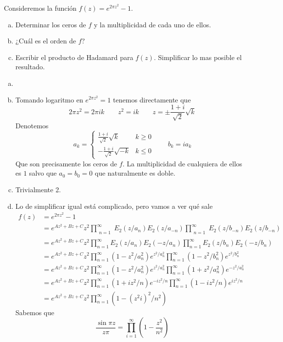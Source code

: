 \documentclass[twoside]{article}
\begin{document}
\newpage
\begin{ejercicio}{4}
Consideremos la función $f(z)=e^{2\pi z^2}-1$.
\begin{enumerate}[a)]
\item Determinar los ceros de $f$ y la multiplicidad de cada uno de ellos. 
\item ¿Cuál es el orden de $f$?
\item Escribir el producto de Hadamard para $f(z)$.  Simplificar lo mas posible el resultado. 
\end{enumerate}
\end{ejercicio}
\begin{solucion}
\begin{enumerate}[a)]
\item[]
\item Tomando logaritmo en $e^{2\pi z^2} = 1$ tenemos directamente que
$$
2\pi z^2 = 2\pi i k \qquad z^2 = ik \qquad z = \pm \frac{1+i}{\sqrt{2}}\sqrt{k} 
$$
Denotemos
$$
a_k = \begin{cases}
\frac{1+i}{\sqrt{2}}\sqrt{k} & k\geq 0\\
-\frac{1+i}{\sqrt{2}}\sqrt{-k} & k\leq 0
\end{cases}
\qquad
b_k = ia_k
$$
Que son precisamente los ceros de $f$. La multiplicidad de cualquiera de ellos es $1$ salvo que $a_0=b_0=0$ que naturalmente es doble. 
\item Trivialmente 2.
\item Lo de simplificar igual está complicado, pero vamos a ver qué sale
\begin{align*}
f(z) & = e^{2\pi z^2}-1\\
&= e^{Az^2+Bz+C}z^2\prod_{\substack{n=1}}^\infty E_2(z/a_{n})E_2(z/a_{-n})\prod_{\substack{n=1}}^\infty E_2(z/b_{-n})E_2(z/b_{-n})\\
&= e^{Az^2+Bz+C}z^2\prod_{n=1}^\infty E_2(z/a_n)E_2(-z/a_{n})\prod_{n=1}^\infty E_2(z/b_n)E_2(-z/b_n)\\
&= e^{Az^2+Bz+C}z^2\prod_{n=1}^\infty (1-z^2/a_n^2)e^{z^2/a_n^2}\prod_{n=1}^\infty  (1-z^2/b_n^2)e^{z^2/b_n^2}\\
&= e^{Az^2+Bz+C}z^2\prod_{n=1}^\infty (1-z^2/a_n^2)e^{z^2/a_n^2}\prod_{n=1}^\infty  (1+z^2/a_n^2)e^{-z^2/a_n^2}\\
&= e^{Az^2+Bz+C}z^2\prod_{n=1}^\infty (1+iz^2/n)e^{-iz^2/n}\prod_{n=1}^\infty  (1-iz^2/n)e^{iz^2/n}\\
&= e^{Az^2+Bz+C}z^2\prod_{n=1}^\infty (1-(z^2i)^2/n^2)
\end{align*}
Sabemos que 
$$
\frac{\sin \pi z}{z\pi} =\prod_{i=1}^\infty\left(1-\frac{z^2}{n^2}\right)
$$
\end{enumerate}
\end{solucion}
\end{document}
